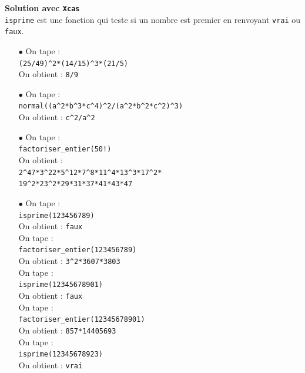 \documentclass[a4paper,11pt]{book}
\begin{document}
{\bf Solution avec {\tt Xcas}}\\
{\tt isprime} est une fonction qui teste si un nombre est premier en renvoyant 
{\tt vrai} ou {\tt faux}.
\begin{enumerate}
\item[$\bullet$]
On tape :\\
{\tt (25/49)\verb|^|2*(14/15)\verb|^|3*(21/5)}\\
On obtient : {\tt 8/9}
\item[$\bullet$]
On tape :\\
{\tt normal((a\verb|^|2*b\verb|^|3*c\verb|^|4)\verb|^|2/(a\verb|^|2*b\verb|^|2*c\verb|^|2)\verb|^|3)}\\
On obtient : {\tt c\verb|^|2/a\verb|^|2}
\item[$\bullet$]
On tape :\\
{\tt factoriser\_entier(50!)}\\
On obtient : \\
{\tt 2\verb|^|47*3\verb|^|22*5\verb|^|12*7\verb|^|8*11\verb|^|4*13\verb|^|3*17\verb|^|2*\\19\verb|^|2*23\verb|^|2*29*31*37*41*43*47}
\item[$\bullet$]
On tape :\\
{\tt isprime(123456789)}\\
On obtient : {\tt faux}\\
On tape :\\
{\tt factoriser\_entier(123456789)}\\
On obtient : {\tt 3\verb|^|2*3607*3803}\\
On tape :\\
{\tt isprime(12345678901)}\\
On obtient : {\tt faux}\\
On tape :\\
{\tt factoriser\_entier(12345678901)}\\
On obtient : {\tt 857*14405693}\\
On tape :\\
{\tt isprime(12345678923)}\\
On obtient : {\tt vrai}
\end{enumerate}
\end{document}
